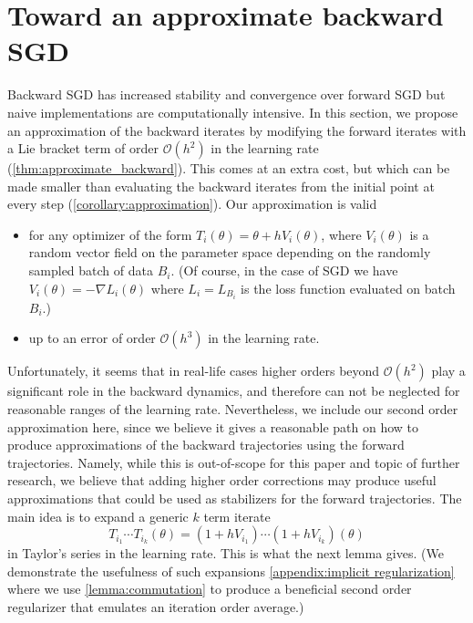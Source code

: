 \documentclass[10pt]{article} %
\theoremstyle{plain}
\theoremstyle{definition}
\theoremstyle{remark}
\begin{document}
\newpage 

\section{Toward an approximate backward SGD}\label{appendix:approximate_backward}

Backward SGD has increased stability and convergence over forward SGD but naive implementations are computationally intensive. In this section, we propose an approximation of the backward iterates by modifying the forward iterates with a Lie bracket term of order $\mathcal O(h^2)$ in the learning rate (\cref{thm:approximate_backward}). This comes at an extra cost, but which can be made smaller than evaluating the backward iterates from the initial point at every step (\cref{corollary:approximation}). 
Our approximation is valid 
\begin{itemize}
\item for any optimizer of the form $T_i(\theta) = \theta + h V_i(\theta)$, where $V_i(\theta)$ is a random vector field on the parameter space depending on the randomly sampled batch of data $B_i$. (Of course, in the case of SGD we have $V_i(\theta) = -\nabla L_i(\theta)$ where $L_i = L_{B_i}$ is the loss function evaluated on batch $B_i$.)
\item up to an error of order $\mathcal O(h^3)$  in the learning rate.
\end{itemize}

Unfortunately, it seems that in real-life cases higher orders beyond $\mathcal O(h^2)$ play a significant role in the backward dynamics, and therefore can not be neglected for reasonable ranges of the learning rate. Nevertheless, we include our second order approximation here, since we believe it gives a reasonable path on how to produce approximations of the backward trajectories using the forward trajectories. Namely, while this is out-of-scope for this paper and topic of further research, we believe that adding higher order corrections may produce useful approximations that could be used as stabilizers for the forward trajectories. 
The main idea is to expand a generic $k$ term iterate 
\begin{equation}
    T_{i_1}  \cdots T_{i_k}(\theta) = (1 + hV_{i_1})\cdots (1 + hV_{i_k})(\theta)
\end{equation}
in Taylor's series in the learning rate. This is what the next lemma gives. (We demonstrate the usefulness of such expansions  \cref{appendix:implicit regularization} where we use \cref{lemma:commutation} to produce a beneficial second order regularizer that emulates an iteration order average.) 
\end{document}
